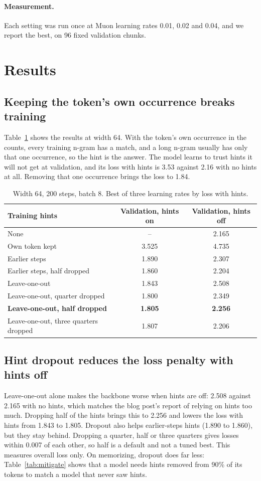 \documentclass[11pt]{article}
\begin{document}
\paragraph{Measurement.} Each setting was run once at Muon learning rates 0.01, 0.02 and 0.04, and we report the best, on 96 fixed validation chunks.

\section{Results}
\subsection{Keeping the token's own occurrence breaks training}
Table~\ref{tab:policy} shows the results at width 64. With the token's own occurrence in the counts, every training n-gram has a match, and a long n-gram usually has only that one occurrence, so the hint is the answer. The model learns to trust hints it will not get at validation, and its loss with hints is 3.53 against 2.16 with no hints at all. Removing that one occurrence brings the loss to 1.84.

\begin{table}[h]\centering
\begin{tabular}{lcc}\toprule
Training hints & Validation, hints on & Validation, hints off\\\midrule
None & -- & 2.165\\
Own token kept & 3.525 & 4.735\\
Earlier steps & 1.890 & 2.307\\
Earlier steps, half dropped & 1.860 & 2.204\\
Leave-one-out & 1.843 & 2.508\\
Leave-one-out, quarter dropped & 1.800 & 2.349\\
\textbf{Leave-one-out, half dropped} & \textbf{1.805} & \textbf{2.256}\\
Leave-one-out, three quarters dropped & 1.807 & 2.206\\\bottomrule
\end{tabular}
\caption{Width 64, 200 steps, batch 8. Best of three learning rates by loss with hints.}\label{tab:policy}
\end{table}

\subsection{Hint dropout reduces the loss penalty with hints off}
Leave-one-out alone makes the backbone worse when hints are off: 2.508 against 2.165 with no hints, which matches the blog post's report of relying on hints too much. Dropping half of the hints brings this to 2.256 and lowers the loss with hints from 1.843 to 1.805. Dropout also helps earlier-steps hints (1.890 to 1.860), but they stay behind. Dropping a quarter, half or three quarters gives losses within 0.007 of each other, so half is a default and not a tuned best. This measures overall loss only. On memorizing, dropout does far less: Table~\ref{tab:mitigate} shows that a model needs hints removed from 90\% of its tokens to match a model that never saw hints.
\end{document}
